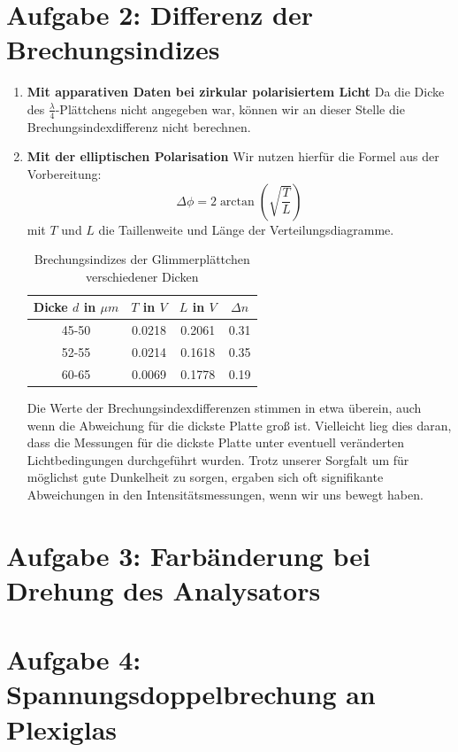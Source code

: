 \documentclass[a4paper,titlepage]{scrartcl}
\numberwithin{equation}{section}
\begin{document}
\section{Aufgabe 2: Differenz der Brechungsindizes}
\begin{enumerate}
\item \textbf{Mit apparativen Daten bei zirkular polarisiertem Licht}
Da die Dicke des $\frac{\lambda}{4}$-Plättchens nicht angegeben war, können wir an dieser Stelle die Brechungsindexdifferenz nicht berechnen.
\item \textbf{Mit der elliptischen Polarisation}
Wir nutzen hierfür die Formel aus der Vorbereitung:
\begin{equation*}
\Delta \phi = 2 \arctan \left( \sqrt{\frac{T}{L}} \right)
\end{equation*}
mit $T$ und $L$ die Taillenweite und Länge der Verteilungsdiagramme.
\begin{table}[H]
\caption{Brechungsindizes der Glimmerplättchen verschiedener Dicken}
\begin{tabular}{c|c|c|c}
	Dicke $d$ in $\mu m$ & $T$ in $V$ & $L$ in $V$ & $\Delta n$ \\
	\hline
	45-50 & 0.0218 & 0.2061 & 0.31 \\
	52-55 & 0.0214 & 0.1618 & 0.35 \\
	60-65 & 0.0069 & 0.1778 & 0.19 \\
\end{tabular}
\label{tab:aufgabe2}
\end{table}
Die Werte der Brechungsindexdifferenzen stimmen in etwa überein, auch wenn die Abweichung für die dickste Platte groß ist. Vielleicht lieg dies daran, dass die Messungen für die dickste Platte unter eventuell veränderten Lichtbedingungen durchgeführt wurden. Trotz unserer Sorgfalt um für möglichst gute Dunkelheit zu sorgen, ergaben sich oft signifikante Abweichungen in den Intensitätsmessungen, wenn wir uns bewegt haben.
\end{enumerate}
\section{Aufgabe 3: Farbänderung bei Drehung des Analysators}
\section{Aufgabe 4: Spannungsdoppelbrechung an Plexiglas}
\end{document}
